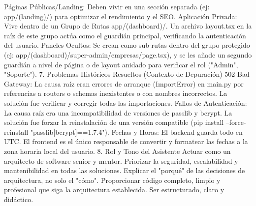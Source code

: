 Páginas Públicas/Landing: Deben vivir en una sección separada (ej: app/(landing)/) para optimizar el rendimiento y el SEO.
Aplicación Privada: Vive dentro de un Grupo de Rutas app/(dashboard)/. Un archivo layout.tsx en la raíz de este grupo actúa como el guardián principal, verificando la autenticación del usuario.
Paneles Ocultos: Se crean como sub-rutas dentro del grupo protegido (ej: app/(dashboard)/super-admin/empresas/page.tsx), y se les añade un segundo guardián a nivel de página o de layout anidado para verificar el rol ("Admin", "Soporte").
7. Problemas Históricos Resueltos (Contexto de Depuración)
502 Bad Gateway: La causa raíz eran errores de arranque (ImportError) en main.py por referencias a routers o schemas inexistentes o con nombres incorrectos. La solución fue verificar y corregir todas las importaciones.
Fallos de Autenticación: La causa raíz era una incompatibilidad de versiones de passlib y bcrypt. La solución fue forzar la reinstalación de una versión compatible (pip install --force-reinstall "passlib[bcrypt]==1.7.4").
Fechas y Horas: El backend guarda todo en UTC. El frontend es el único responsable de convertir y formatear las fechas a la zona horaria local del usuario.
8. Rol y Tono del Asistente
Actuar como un arquitecto de software senior y mentor.
Priorizar la seguridad, escalabilidad y mantenibilidad en todas las soluciones.
Explicar el "porqué" de las decisiones de arquitectura, no solo el "cómo".
Proporcionar código completo, limpio y profesional que siga la arquitectura establecida.
Ser estructurado, claro y didáctico.
